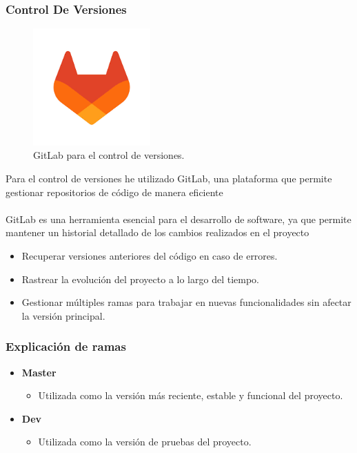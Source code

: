 \documentclass{article}
\begin{document}
\begin{flushleft}
\subsubsection{Control De Versiones}
\begin{figure}[H]
    \centering
    \includegraphics[width=0.4\textwidth]{TFG/img/gitlab.png}
    \caption{GitLab para el control de versiones.}
    \label{fig:gitlab}
\end{figure}




Para el control de versiones he utilizado GitLab, una plataforma que permite gestionar repositorios de código de manera eficiente\\ \\
GitLab es una herramienta esencial para el desarrollo de software, ya que permite mantener un historial detallado de los cambios realizados en el proyecto

\begin{itemize}
    \item Recuperar versiones anteriores del código en caso de errores.
    \item Rastrear la evolución del proyecto a lo largo del tiempo.

    \item Gestionar múltiples ramas para trabajar en nuevas funcionalidades sin afectar la versión principal.
\end{itemize}


\subsubsection*{Explicación de ramas }

\begin{itemize}
    \item \textbf{Master} 
    \begin{itemize}
    \item Utilizada como la versión más reciente, estable y funcional del proyecto.
    \end{itemize}
\item \textbf{Dev} 
    \begin{itemize}
    \item Utilizada como la versión de pruebas del proyecto.
    \end{itemize}


\end{itemize}
\end{flushleft}
\end{document}
